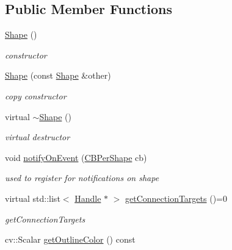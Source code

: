 \subsection*{Public Member Functions}
\begin{DoxyCompactItemize}
\item 
\hyperlink{classcanvascv_1_1Shape_a291cd0e85563ad130fdb91882645b3ad}{Shape} ()\hypertarget{classcanvascv_1_1Shape_a291cd0e85563ad130fdb91882645b3ad}{}\label{classcanvascv_1_1Shape_a291cd0e85563ad130fdb91882645b3ad}

\begin{DoxyCompactList}\small\item\em constructor \end{DoxyCompactList}\item 
\hyperlink{classcanvascv_1_1Shape_a625c1941672f157dc6b9fdc83b7f360d}{Shape} (const \hyperlink{classcanvascv_1_1Shape}{Shape} \&other)\hypertarget{classcanvascv_1_1Shape_a625c1941672f157dc6b9fdc83b7f360d}{}\label{classcanvascv_1_1Shape_a625c1941672f157dc6b9fdc83b7f360d}

\begin{DoxyCompactList}\small\item\em copy constructor \end{DoxyCompactList}\item 
virtual \hyperlink{classcanvascv_1_1Shape_a5819d123de258453c06b0e9dcdf60e77}{$\sim$\+Shape} ()\hypertarget{classcanvascv_1_1Shape_a5819d123de258453c06b0e9dcdf60e77}{}\label{classcanvascv_1_1Shape_a5819d123de258453c06b0e9dcdf60e77}

\begin{DoxyCompactList}\small\item\em virtual destructor \end{DoxyCompactList}\item 
void \hyperlink{classcanvascv_1_1Shape_ad2ce0148fa4d79225976334dc1d0d287}{notify\+On\+Event} (\hyperlink{classcanvascv_1_1Shape_ab36440a99a65779c9b3270dc83625b9b}{C\+B\+Per\+Shape} cb)
\begin{DoxyCompactList}\small\item\em used to register for notifications on shape \end{DoxyCompactList}\item 
virtual std\+::list$<$ \hyperlink{classcanvascv_1_1Handle}{Handle} $\ast$ $>$ \hyperlink{classcanvascv_1_1Shape_a827822e17e24118e16fa932ac0e71cd2}{get\+Connection\+Targets} ()=0
\begin{DoxyCompactList}\small\item\em get\+Connection\+Targets \end{DoxyCompactList}\item 
cv\+::\+Scalar \hyperlink{classcanvascv_1_1Shape_a67d3bdec3be2a29c3612c87208589838}{get\+Outline\+Color} () const \hypertarget{classcanvascv_1_1Shape_a67d3bdec3be2a29c3612c87208589838}{}\label{classcanvascv_1_1Shape_a67d3bdec3be2a29c3612c87208589838}


\end{DoxyCompactItemize}
